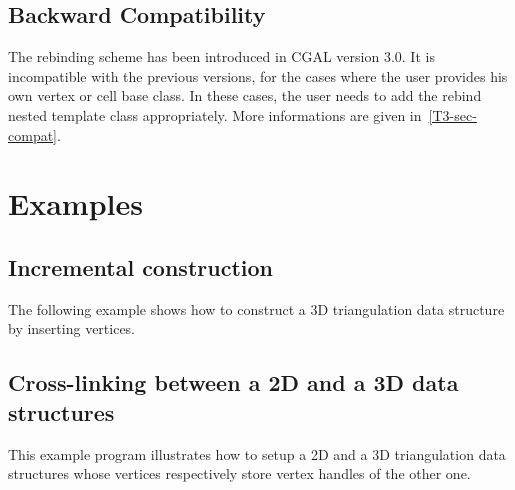 \subsection{Backward Compatibility}
The rebinding scheme has been introduced in CGAL version 3.0.  It is
incompatible with the previous versions, for the cases where the user provides
his own vertex or cell base class.  In these cases, the user needs to add
the rebind nested template class appropriately.  More informations are given
in~\ref{T3-sec-compat}.

\section{Examples}
\label{TDS3-sec-examples}

\subsection{Incremental construction}
The following example shows how to construct a 3D triangulation data
structure by inserting vertices.


\subsection{Cross-linking between a 2D and a 3D data structures}
This example program illustrates how to setup a 2D and a 3D triangulation data
structures whose vertices respectively store vertex handles of the other one.

